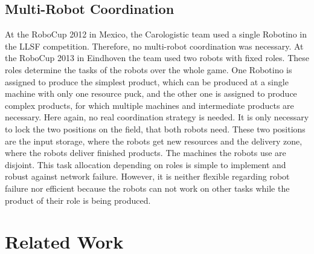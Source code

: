 \documentclass[a4paper,11pt,hidelinks]{article}
\begin{document}
\subsection{Multi-Robot Coordination}
At the RoboCup 2012 in Mexico, the Carologistic team used a single Robotino in the LLSF competition. Therefore, no multi-robot coordination was necessary. At the RoboCup 2013 in Eindhoven the team used two robots with fixed roles. These roles determine the tasks of the robots over the whole game. One Robotino is assigned to produce the simplest product, which can be produced at a single machine with only one resource puck, and the other one is assigned to produce complex products, for which multiple machines and intermediate products are necessary. Here again, no real coordination strategy is needed. It is only necessary to lock the two positions on the field, that both robots need. These two positions are the input storage, where the robots get new resources and the delivery zone, where the robots deliver finished products. The machines the robots use are disjoint. This task allocation depending on roles is simple to implement and robust against network failure. However, it is neither flexible regarding robot failure nor efficient because the robots can not work on other tasks while the product of their role is being produced.\\

\section{Related Work}
\end{document}
